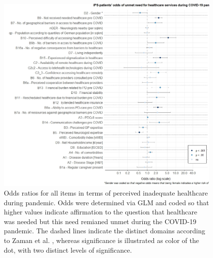 \documentclass[a4paper,oneside,11pt,english]{scrartcl}
\begin{document}
\begin{figure}[!h]
	\centering
	\includegraphics[width=\textwidth]{fig3.oddsratios.v1.0.jpeg}
	\caption{Odds ratios for all items in terms of perceived inadequate healthcare during pandemic. Odds were determined via \textsc{GLM} and coded so that higher values indicate affirmation to the question that healthcare was needed but this need remianed unmet during the \textsc{COVID}-19 pandemic. The dashed lines indicate the distinct domains according to Zaman et al. \cite{zaman2021barriers}, whereas significance is illustrated as color of the dot, with two distinct levels of significance. }
	\label{fig3:resultsOR1}
\end{figure}
\end{document}
